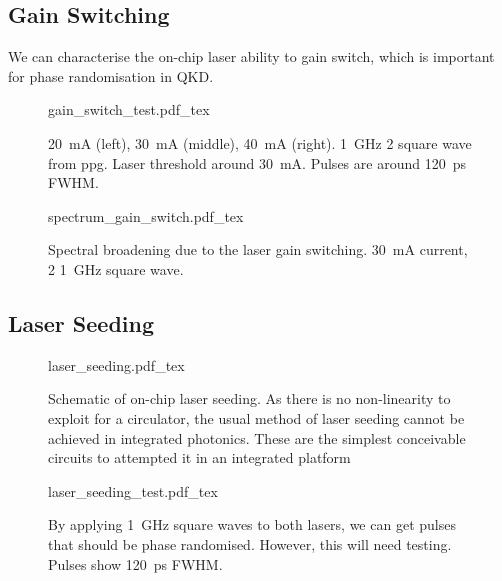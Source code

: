 \subsection{Gain Switching}

We can characterise the on-chip laser ability to gain switch, which is important for phase randomisation in \ac{QKD}. 

\begin{figure}[tp]
	\centering
	\small	
	\def\svgwidth{\textwidth} 
	{gain_switch_test.pdf_tex}
	\caption[Gain switching test of the HHI on-chip lasers]{\SI{20}{mA} (left), \SI{30}{\mA} (middle), \SI{40}{\mA} (right). \SI{1}{GHz} \SI{2}{\Vpp} square wave from \ac{ppg}. Laser threshold around \SI{30}{mA}. Pulses are around \SI{120}{ps} \ac{FWHM}.}
	\label{fig:gain_switch_test}
\end{figure}

\begin{figure}[tp]
	\centering
	\small	
	\def\svgwidth{0.9\textwidth} 
	{spectrum_gain_switch.pdf_tex}
	\caption[Spectrum of the gain switched laser]{Spectral broadening due to the laser gain switching. \SI{30}{mA} current, \SI{2}{\Vpp} \SI{1}{\GHz} square wave.}
	\label{fig:gain_switch_spectrum}
\end{figure}

\subsection{Laser Seeding}


\begin{figure}[tp]
	\centering	
	\def\svgwidth{0.9\textwidth} 
	{laser_seeding.pdf_tex}
	\caption[Schematic of on-chip laser seeding]{Schematic of on-chip laser seeding. As there is no non-linearity to exploit for a circulator, the usual method of laser seeding cannot be achieved in integrated photonics. These are the simplest conceivable circuits to attempted it in an integrated platform}
	\label{fig:las_seed_schem}
\end{figure}


\begin{figure}[tp]
	\centering	
	\def\svgwidth{0.8\textwidth} 
	{laser_seeding_test.pdf_tex}
	\caption[Integrated laser seeding test]{By applying \SI{1}{GHz} square waves to both lasers, we can get pulses that should be phase randomised. However,  this will need testing. Pulses show \SI{120}{ps} \ac{FWHM}.}
	\label{fig:las_seed_test}
\end{figure}

